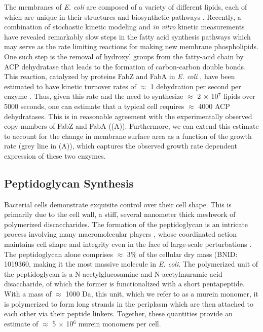 The membranes of \textit{E. coli} are composed of a variety of different lipids,
each of which are unique in their structures and biosynthetic pathways
\citep{sohlenkamp2016}. Recently, a combination of stochastic kinetic modeling
\citep{ruppe2018} and \textit{in vitro} kinetic measurements
\citep{ranganathan2012, yu2011} have revealed remarkably slow steps in the fatty
acid synthesis pathways which may serve as the rate limiting reactions for
making new membrane phospholipids. One such
step is the removal of hydroxyl groups from the fatty-acid chain by ACP
dehydratase that leads to the formation of carbon-carbon double bonds. This
reaction, catalyzed by proteins FabZ and FabA in \textit{E. coli}
\citep{yu2011}, have been estimated to have kinetic turnover rates of $\approx$
1 dehydration per second per enzyme \citep{ruppe2018}. Thus, given this rate and
the need to synthesize $\approx$ 2 $\times$ 10$^7$ lipids over 5000 seconds, one
can estimate that a typical cell requires $\approx$ 4000 ACP dehydratases. This
is in reasonable agreement with the experimentally observed copy numbers of FabZ
and FabA ((A)). Furthermore, we can extend this estimate to
account for the change in membrane surface area as a function of the growth rate
(grey line in (A)), which captures the observed growth rate
dependent expression of these two enzymes.

\subsection{Peptidoglycan Synthesis}
Bacterial cells demonstrate exquisite control over their cell shape. This is
primarily due to the cell wall, a stiff, several nanometer thick meshwork of
polymerized discaccharides. The formation of the peptidoglycan is an intricate
process involving many macromolecular players \citep{shi2018, morgenstein2015},
whose coordinated action maintains cell shape and integrity even in the face of
large-scale perturbations \citep{harris2018,shi2018}.
The peptidoglycan alone comprises $\approx$ 3\% of the cellular dry mass (BNID:
1019360, making it the most massive molecule in \textit{E. coli}. The
polymerized unit of the peptidoglycan is a N-acetylglucosamine and 
N-acetylmuramic acid disaccharide, of which the former is functionalized with a
short pentapeptide. With a mass of $\approx$ 1000 Da, this unit, which we refer
to as a murein monomer, it is polymerized to form long strands in the periplasm
which are then attached to each other via their peptide linkers. Together, these
quantities provide an estimate of $\approx$ 5 $\times$ 10$^6$ murein monomers
per cell.

